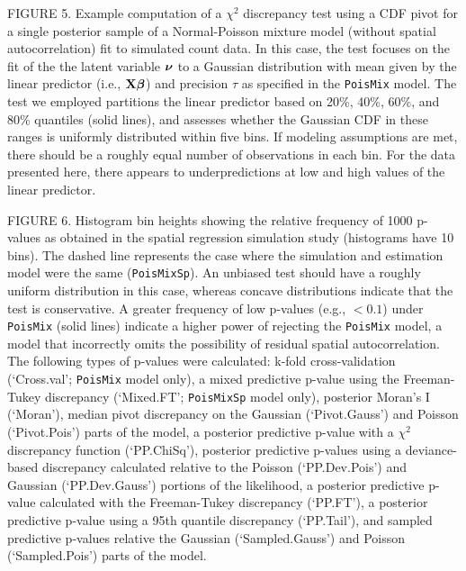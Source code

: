 \documentclass[12pt,english]{article}
\begin{document}
\begin{spacing}{1.9}
    FIGURE 5.  Example computation of a $\chi^2$ discrepancy test
    using a CDF pivot for a single posterior sample of a
    Normal-Poisson mixture model (without spatial autocorrelation) fit
    to simulated count data.  In this case, the test focuses on the
    fit of the the latent variable $\boldsymbol{\nu}$ to a Gaussian distribution
    with mean given by the linear predictor (i.e., ${\bf X}\boldsymbol{\beta}$) and
    precision $\tau$ as specified in the \texttt{PoisMix} model. The
    test we employed partitions the linear predictor based on 20\%,
    40\%, 60\%, and 80\% quantiles (solid lines), and assesses whether
    the Gaussian CDF in these ranges is uniformly distributed within
    five bins.  If modeling assumptions are met, there should be a
    roughly equal number of observations in each bin.  For the data
    presented here, there appears to underpredictions at low and high
    values of the linear predictor.

    FIGURE 6.  Histogram bin heights showing the relative frequency of
    1000 p-values as obtained in the spatial regression simulation
    study (histograms have 10 bins).  The dashed line represents the
    case where the simulation and estimation model were the same
    (\texttt{PoisMixSp}).  An unbiased test should have a roughly
    uniform distribution in this case, whereas concave distributions
    indicate that the test is conservative.  A greater frequency of
    low p-values (e.g., $<0.1$) under \texttt{PoisMix} (solid lines)
    indicate a higher power of rejecting the \texttt{PoisMix} model, a
    model that incorrectly omits the possibility of residual spatial
    autocorrelation.  The following types of p-values were calculated:
    k-fold cross-validation (`Cross.val'; \texttt{PoisMix} model
    only), a mixed predictive p-value using the Freeman-Tukey
    discrepancy (`Mixed.FT'; \texttt{PoisMixSp} model only), posterior
    Moran's I (`Moran'), median pivot discrepancy on the Gaussian
    (`Pivot.Gauss') and Poisson (`Pivot.Pois') parts of the model, a
    posterior predictive p-value with a $\chi^2$ discrepancy function
    (`PP.ChiSq'), posterior predictive p-values using a deviance-based
    discrepancy calculated relative to the Poisson (`PP.Dev.Pois') and
    Gaussian (`PP.Dev.Gauss') portions of the likelihood, a posterior
    predictive p-value calculated with the Freeman-Tukey discrepancy
    (`PP.FT'), a posterior predictive p-value using a 95th quantile
    discrepancy (`PP.Tail'), and sampled predictive p-values relative
    the Gaussian (`Sampled.Gauss') and Poisson (`Sampled.Pois') parts
    of the model.



\end{spacing}
\end{document}
